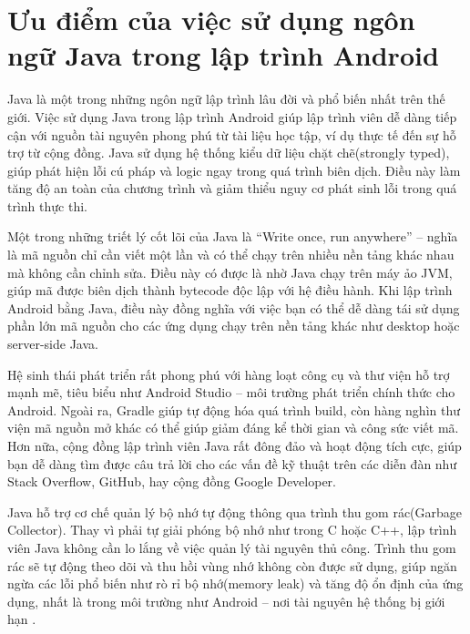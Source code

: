 \section{Ưu điểm của việc sử dụng ngôn ngữ Java trong lập trình Android}
        Java là một trong những ngôn ngữ lập trình lâu đời và phổ biến nhất trên thế giới. Việc sử dụng Java trong lập trình Android giúp lập trình viên dễ dàng tiếp cận với nguồn tài nguyên phong phú từ tài liệu học tập, ví dụ thực tế đến sự hỗ trợ từ cộng đồng. Java sử dụng hệ thống kiểu dữ liệu chặt chẽ(strongly typed), giúp phát hiện lỗi cú pháp và logic ngay trong quá trình biên dịch. Điều này làm tăng độ an toàn của chương trình và giảm thiểu nguy cơ phát sinh lỗi trong quá trình thực thi.

        \vspace{0.5em}

        Một trong những triết lý cốt lõi của Java là “Write once, run anywhere” – nghĩa là mã nguồn chỉ cần viết một lần và có thể chạy trên nhiều nền tảng khác nhau mà không cần chỉnh sửa. Điều này có được là nhờ Java chạy trên máy ảo JVM, giúp mã được biên dịch thành bytecode độc lập với hệ điều hành. Khi lập trình Android bằng Java, điều này đồng nghĩa với việc bạn có thể dễ dàng tái sử dụng phần lớn mã nguồn cho các ứng dụng chạy trên nền tảng khác như desktop hoặc server-side Java.

        \vspace{0.5em}

        Hệ sinh thái phát triển rất phong phú với hàng loạt công cụ và thư viện hỗ trợ mạnh mẽ, tiêu biểu như Android Studio – môi trường phát triển chính thức cho Android. Ngoài ra, Gradle giúp tự động hóa quá trình build, còn hàng nghìn thư viện mã nguồn mở khác có thể giúp giảm đáng kể thời gian và công sức viết mã. Hơn nữa, cộng đồng lập trình viên Java rất đông đảo và hoạt động tích cực, giúp bạn dễ dàng tìm được câu trả lời cho các vấn đề kỹ thuật trên các diễn đàn như Stack Overflow, GitHub, hay cộng đồng Google Developer.

        \vspace{0.5em}

        Java hỗ trợ cơ chế quản lý bộ nhớ tự động thông qua trình thu gom rác(Garbage Collector). Thay vì phải tự giải phóng bộ nhớ như trong C hoặc C++, lập trình viên Java không cần lo lắng về việc quản lý tài nguyên thủ công. Trình thu gom rác sẽ tự động theo dõi và thu hồi vùng nhớ không còn được sử dụng, giúp ngăn ngừa các lỗi phổ biến như rò rỉ bộ nhớ(memory leak) và tăng độ ổn định của ứng dụng, nhất là trong môi trường như Android – nơi tài nguyên hệ thống bị giới hạn \cite{java-tutorial}.
    
